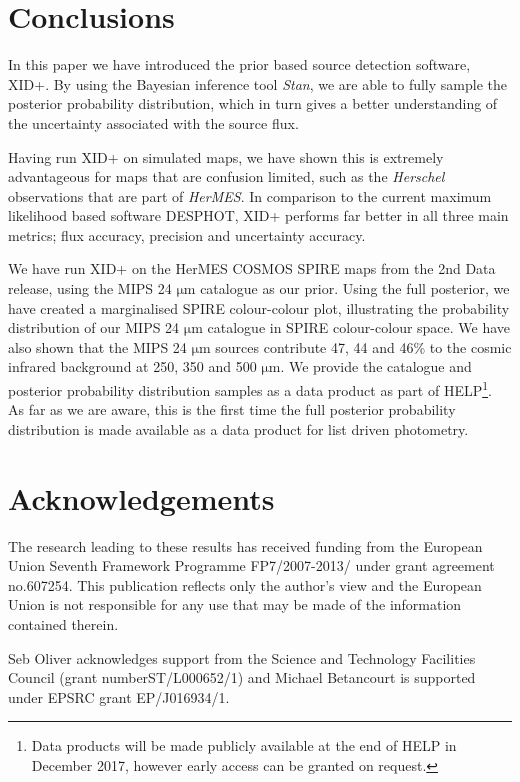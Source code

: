 \documentclass[useAMS,usenatbib]{mnras}
\begin{document}
\section{Conclusions}\label{sec:conc}
In this paper we have introduced the prior based source detection software, \textsc{XID+}. By using the Bayesian inference tool \emph{Stan}, we are able to fully sample the posterior probability distribution, which in turn gives a better understanding of the uncertainty associated with the source flux. 

Having run \textsc{XID+} on simulated maps, we have shown this is extremely advantageous for maps that are confusion limited, such as the \emph{Herschel} observations that are part of \emph{HerMES}. In comparison to the current maximum likelihood based software \textsc{DESPHOT}, XID+ performs far better in all three main metrics; flux accuracy, precision and uncertainty accuracy.

We have run \textsc{XID+} on the HerMES COSMOS SPIRE maps from the 2nd Data release, using the MIPS 24 $\mathrm{\mu m}$ catalogue \citep{LeFLoch:2009} as our prior. Using the full posterior, we have created a marginalised SPIRE colour-colour plot, illustrating the probability distribution of our MIPS 24 $\mathrm{\mu m}$ catalogue in SPIRE colour-colour space. We have also shown that the MIPS 24 $\mathrm{\mu m}$ sources contribute 47, 44 and 46\%  to the cosmic infrared background at 250, 350 and 500 $\mathrm{\mu m}$. We provide the catalogue and posterior probability distribution samples as a data product as part of HELP\textcolor{red}{\footnote{Data products will be made publicly available at the end of HELP in December 2017, however early access can be granted on request.}}. As far as we are aware, this is the first time the full posterior probability distribution is made available as a data product for list driven photometry.
 

\section*{Acknowledgements}%
The research leading to these results has received funding from the European Union Seventh Framework Programme FP7/2007-2013/ under grant agreement no.607254. This publication reflects only the author's view and the European Union is not responsible for any use that may be made of the information contained therein. 

Seb Oliver acknowledges support from the Science and Technology Facilities Council (grant numberST/L000652/1) and Michael Betancourt is supported under EPSRC grant EP/J016934/1.
\end{document}
